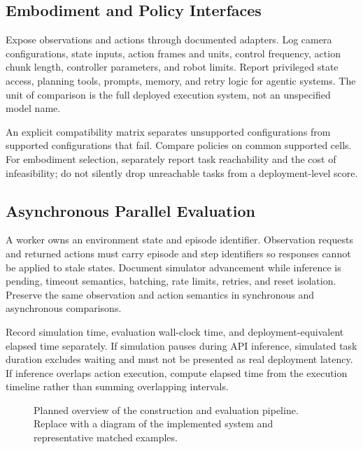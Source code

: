 \subsection{Embodiment and Policy Interfaces}
\label{sec:gb_interfaces}
Expose observations and actions through documented adapters. Log camera configurations, state inputs, action frames and units, control frequency, action chunk length, controller parameters, and robot limits. Report privileged state access, planning tools, prompts, memory, and retry logic for agentic systems. The unit of comparison is the full deployed execution system, not an unspecified model name.

An explicit compatibility matrix separates unsupported configurations from supported configurations that fail. Compare policies on common supported cells. For embodiment selection, separately report task reachability and the cost of infeasibility; do not silently drop unreachable tasks from a deployment-level score.

\subsection{Asynchronous Parallel Evaluation}
\label{sec:gb_async}
A worker owns an environment state and episode identifier. Observation requests and returned actions must carry episode and step identifiers so responses cannot be applied to stale states. Document simulator advancement while inference is pending, timeout semantics, batching, rate limits, retries, and reset isolation. Preserve the same observation and action semantics in synchronous and asynchronous comparisons.

Record simulation time, evaluation wall-clock time, and deployment-equivalent elapsed time separately. If simulation pauses during API inference, simulated task duration excludes waiting and must not be presented as real deployment latency. If inference overlaps action execution, compute elapsed time from the execution timeline rather than summing overlapping intervals.

\begin{figure}[t]
\centering
{}
\caption{Planned overview of the construction and evaluation pipeline. Replace with a diagram of the implemented system and representative matched examples.}
\label{fig:gb_pipeline}
\end{figure}

